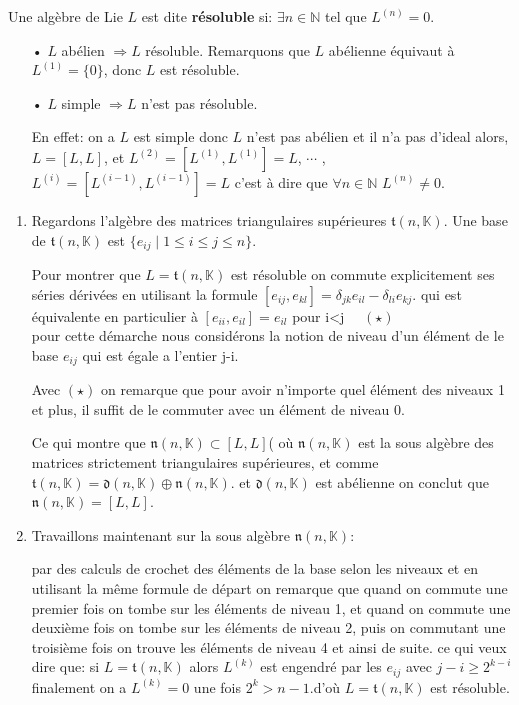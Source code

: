 \documentclass[a4paper,openany,12pt]{report}
\newcommand{\KK}{\mathbb{K}}
\newcommand{\NN}{\mathbb{N}}
\newcommand{\ttt}{\mathfrak{t}}
\newcommand{\nn}{\mathfrak{n}}
\newcommand{\dd}{\mathfrak{d}}
\theoremstyle{break}
{\theorembodyfont{\upshape}
\newtheorem*{rmq}{Remarque :}
\newtheorem*{prv}{Preuve :}
\newtheorem*{ex}{Exemples :}
\newtheorem*{exe}{Exemple : }
\newtheorem*{nota}{Notation :}
\newtheorem*{dem}{D\'emonstration :}}
\begin{document}
\begin{df}
\quad Une algèbre de Lie $L$ est dite \textbf{résoluble} si: $\exists n \in \NN $ tel que $L^{(n)}=0$.
\end{df}

\begin{rmq}
\begin{itemize}
\item[•]  $L$ abélien $\Rightarrow L$ résoluble. Remarquons que $L$ abélienne équivaut à $L^{(1)} = \{0\}$, donc $L$ est résoluble.

\item[•]  $L$ simple $\Rightarrow L$ n'est pas résoluble.

En effet: on a  $L$ est simple donc $L$ n'est pas  abélien et il n'a pas d'ideal alors, $L = [L,L]$, et $L^{(2)} = [L^{(1)},L^{(1)}] = L$, $\cdots$ , $L^{(i)} = [L^{(i-1)},L^{(i-1)}]=L $ c'est à dire que $\forall n \in \NN $  $L^{(n)}\ne 0$.
\end{itemize}
\end{rmq}

\begin{ex}
\begin{enumerate}
\item Regardons l'algèbre des matrices triangulaires supérieures $\ttt(n,\KK)$. Une base de $\ttt(n,\KK)$ est $\{ e_{ij} \mid 1\leq i \leq j\leq n \}$.

Pour montrer que $L = \ttt(n,\KK)$  est résoluble on commute explicitement ses séries dérivées en utilisant la formule $ [ e_{ij},e_{kl} ]  = \delta_{jk}e_{il}  -  \delta_{li}e_{kj} $.
qui est équivalente en particulier à  $[ e_{ii},e_{il} ]  = e_{il} $ pour i<j $\quad (\star) $\\ pour cette démarche nous considérons la notion de niveau d'un élément de le base $e_{ij}$ qui est égale a l'entier j-i.

Avec $(\star) $ on remarque que pour avoir n'importe quel élément des niveaux 1 et plus, il suffit de le  commuter avec un élément de niveau 0.

Ce qui montre que  $ \nn(n,\KK) \subset [L,L] $( où  $ \nn(n,\KK)$ est  la sous algèbre des matrices strictement triangulaires supérieures, et comme $\ttt(n,\KK)=\dd(n,\KK) \oplus \nn(n,\KK)$. et $\dd(n,\KK)$ est abélienne on conclut que $ \nn(n,\KK) = [L,L] $.

\item Travaillons maintenant sur la sous algèbre $ \nn(n,\KK): $

par des calculs de crochet des éléments de la base selon les niveaux et en utilisant la même formule de départ on remarque que quand on commute une premier fois on tombe sur les éléments de niveau 1, et quand on commute une deuxième fois on tombe sur les éléments de niveau 2, puis on commutant une troisième fois on trouve les éléments de niveau 4 et ainsi de suite. ce qui veux dire que: si $L=\ttt(n,\KK)$ alors $L^{(k)}$ est engendré par les $e_{ij}$ avec $j-i\ge 2^{k-i}$\\
finalement on a $L^{(k)}=0$ une fois $2^{k}>n-1$.d'où  $L=\ttt(n,\KK)$ est résoluble.
\end{enumerate}
\end{ex}
\end{document}
